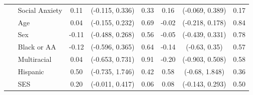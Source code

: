\documentclass[english,man,floatsintext]{apa6}
\begin{document}
\begin{table}[tbp]
\begin{center}
\begin{threeparttable}
\begin{tabular}{lcccccc}
\ \ \ Social Anxiety & 0.11 & (-0.115, 0.336) & 0.33 & 0.16 & (-0.069, 0.389) & 0.17\\
\ \ \ Age & 0.04 & (-0.155, 0.232) & 0.69 & -0.02 & (-0.218, 0.178) & 0.84\\
\ \ \ Sex & -0.11 & (-0.488, 0.268) & 0.56 & -0.05 & (-0.439, 0.331) & 0.78\\
\ \ \ Black or AA & -0.12 & (-0.596, 0.365) & 0.64 & -0.14 & (-0.63, 0.35) & 0.57\\
\ \ \ Multiracial & 0.04 & (-0.653, 0.731) & 0.91 & -0.20 & (-0.903, 0.508) & 0.58\\
\ \ \ Hispanic & 0.50 & (-0.735, 1.746) & 0.42 & 0.58 & (-0.68, 1.848) & 0.36\\
\ \ \ SES & 0.20 & (-0.011, 0.417) & 0.06 & 0.08 & (-0.143, 0.293) & 0.50\\
\bottomrule
\end{tabular}

\end{threeparttable}
\end{center}

\end{table}
\end{document}
